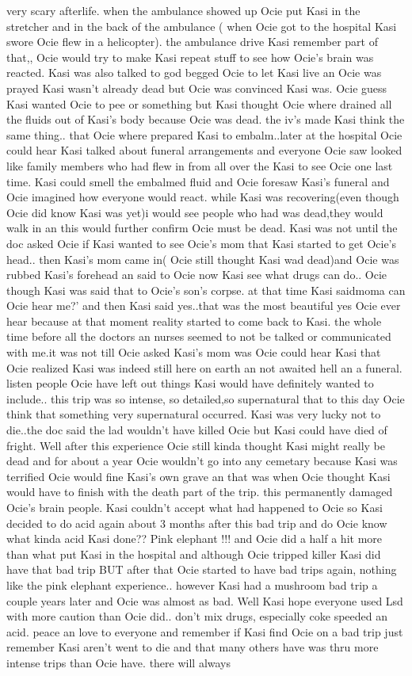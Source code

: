 \documentclass[12pt]{book}
\begin{document}
very scary afterlife. when the ambulance showed up Ocie put Kasi in the stretcher and in the back of the ambulance ( when Ocie got to the hospital Kasi swore Ocie flew in a helicopter). the ambulance drive Kasi remember part of that,, Ocie would try to make Kasi repeat stuff to see how Ocie's brain was reacted. Kasi was also talked to god begged Ocie to let Kasi live an Ocie was prayed Kasi wasn't already dead but Ocie was convinced Kasi was. Ocie guess Kasi wanted Ocie to pee or something but Kasi thought Ocie where drained all the fluids out of Kasi's body because Ocie was dead. the iv's made Kasi think the same thing.. that Ocie where prepared Kasi to embalm..later at the hospital Ocie could hear Kasi talked about funeral arrangements and everyone Ocie saw looked like family members who had flew in from all over the Kasi to see Ocie one last time. Kasi could smell the embalmed fluid and Ocie foresaw Kasi's funeral and Ocie imagined how everyone would react. while Kasi was recovering(even though Ocie did know Kasi was yet)i would see people who had was dead,they would walk in an this would further confirm Ocie must be dead. Kasi was not until the doc asked Ocie if Kasi wanted to see Ocie's mom that Kasi started to get Ocie's head.. then Kasi's mom came in( Ocie still thought Kasi wad dead)and Ocie was rubbed Kasi's forehead an said to Ocie now Kasi see what drugs can do.. Ocie though Kasi was said that to Ocie's son's corpse. at that time Kasi saidmoma can Ocie hear me?' and then Kasi said yes..that was the most beautiful yes Ocie ever hear because at that moment reality started to come back to Kasi. the whole time before all the doctors an nurses seemed to not be talked or communicated with me.it was not till Ocie asked Kasi's mom was Ocie could hear Kasi that Ocie realized Kasi was indeed still here on earth an not awaited hell an a funeral. listen people Ocie have left out things Kasi would have definitely wanted to include.. this trip was so intense, so detailed,so supernatural that to this day Ocie think that something very supernatural occurred. Kasi was very lucky not to die..the doc said the lad wouldn't have killed Ocie but Kasi could have died of fright. Well after this experience Ocie still kinda thought Kasi might really be dead and for about a year Ocie wouldn't go into any cemetary because Kasi was terrified Ocie would fine Kasi's own grave an that was when Ocie thought Kasi would have to finish with the death part of the trip. this permanently damaged Ocie's brain people. Kasi couldn't accept what had happened to Ocie so Kasi decided to do acid again about 3 months after this bad trip and do Ocie know what kinda acid Kasi done?? Pink elephant !!! and Ocie did a half a hit more than what put Kasi in the hospital and although Ocie tripped killer Kasi did have that bad trip BUT after that Ocie started to have bad trips again, nothing like the pink elephant experience.. however Kasi had a mushroom bad trip a couple years later and Ocie was almost as bad. Well Kasi hope everyone used Lsd with more caution than Ocie did.. don't mix drugs, especially coke speeded an acid. peace an love to everyone and remember if Kasi find Ocie on a bad trip just remember Kasi aren't went to die and that many others have was thru more intense trips than Ocie have. there will always 
\end{document}
